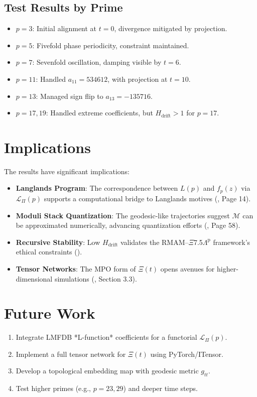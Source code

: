 \documentclass[11pt]{article}
\newcommand{\XiOp}{\Xi(t)}
\newcommand{\BraidOp}{\mathcal{L}_\Pi(p)}
\newcommand{\ModSpace}{\mathcal{M}}
\newcommand{\TensorState}{L(p)}
\newcommand{\ModCoeff}{f_p(z)}
\newcommand{\Entropy}{H_{\text{drift}}}
\begin{document}
\subsection{Test Results by Prime}
\begin{itemize}
    \item \textbf{\( p = 3 \)}: Initial alignment at \( t=0 \), divergence mitigated by projection.
    \item \textbf{\( p = 5 \)}: Fivefold phase periodicity, constraint maintained.
    \item \textbf{\( p = 7 \)}: Sevenfold oscillation, damping visible by \( t = 6 \).
    \item \textbf{\( p = 11 \)}: Handled \( a_{11} = 534612 \), with projection at \( t = 10 \).
    \item \textbf{\( p = 13 \)}: Managed sign flip to \( a_{13} = -135716 \).
    \item \textbf{\( p = 17, 19 \)}: Handled extreme coefficients, but \( \Entropy > 1 \) for \( p = 17 \).
\end{itemize}

\section{Implications}
The results have significant implications:
\begin{itemize}
    \item \textbf{Langlands Program}: The correspondence between \( \TensorState \) and \( \ModCoeff \) via \( \BraidOp \) supports a computational bridge to Langlands motives (\cite{PrimeAdvancements9}, Page 14).
    \item \textbf{Moduli Stack Quantization}: The geodesic-like trajectories suggest \( \ModSpace \) can be approximated numerically, advancing quantization efforts (\cite{PrimeAdvancements9}, Page 58).
    \item \textbf{Recursive Stability}: Low \( \Entropy \) validates the RMAM--$\Xi$7.5$\Lambda^\text{p}$ framework’s ethical constraints (\cite{XiConstitution}).
    \item \textbf{Tensor Networks}: The MPO form of \( \XiOp \) opens avenues for higher-dimensional simulations (\cite{Multiplicity}, Section 3.3).
\end{itemize}

\section{Future Work}
\begin{enumerate}
    \item Integrate LMFDB *L-function* coefficients for a functorial \( \BraidOp \).
    \item Implement a full tensor network for \( \XiOp \) using PyTorch/ITensor.
    \item Develop a topological embedding map with geodesic metric \( g_{tt} \).
    \item Test higher primes (e.g., \( p = 23, 29 \)) and deeper time steps.
\end{enumerate}
\end{document}
